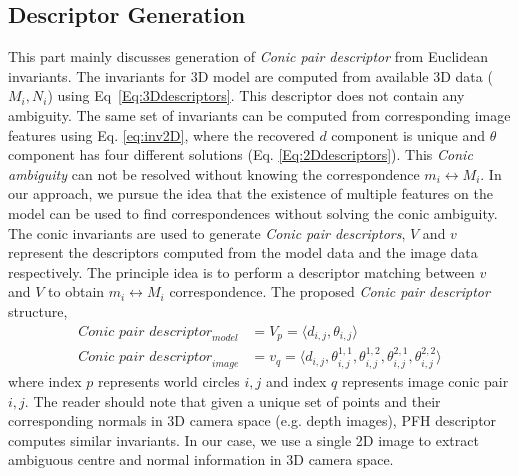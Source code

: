 \documentclass{bmvc2k}
\newcommand{\eref}[1]{Eq\bmvaOneDot~\ref{#1}}
\begin{document}
\subsection{Descriptor Generation}\label{ssec:descriptor}
This part mainly discusses generation of \textit{Conic pair descriptor} from Euclidean invariants. 
The invariants for 3D model are computed from available 3D data ($M_i,N_i$) using \eref{Eq:3Ddescriptors}. This descriptor does not contain any ambiguity.
The same set of invariants can be computed from corresponding image features using Eq. \ref{eq:inv2D}, where the recovered $ d $ component is unique and $ \theta $ component has four different solutions (Eq. \ref{Eq:2Ddescriptors}). 
This \textit{Conic ambiguity} can not be resolved without knowing the correspondence $ m_i \leftrightarrow M_i $.
In our approach, we pursue the idea that the existence of multiple features on the model can be used to find correspondences without solving the conic ambiguity. 
The conic invariants are used to generate \textit{Conic pair descriptors}, $ V $ and $ v $ represent the descriptors computed from the model data and the image data respectively.
The principle idea is to perform a descriptor matching between $ v $ and $ V $ to obtain $ m_i \leftrightarrow M_i $ correspondence.
The proposed \textit{Conic pair descriptor} structure,
\begin{align}
\textit{Conic pair descriptor}_{model} &= V_{p} = \langle d_{i,j},\theta_{i,j} \rangle \label{Eq:3Ddescriptors} \\
\textit{Conic pair descriptor}_{image} &= v_{q} = 
			\langle  d_{i,j},\theta_{i,j}^{1,1},\theta_{i,j}^{1,2},\theta_{i,j}^{2,1},\theta_{i,j}^{2,2} \rangle \label{Eq:2Ddescriptors} 
\end{align}
where index $p$ represents world circles $i,j$ and index $q$ represents image conic pair $i,j$.
The reader should note that given a unique set of points and their corresponding normals in 3D camera space (e.g. depth images), PFH descriptor \cite{RusuDoctoralDissertation} computes similar invariants.
In our case, we use a single 2D image to extract ambiguous centre and normal information in 3D camera space.  
\end{document}
